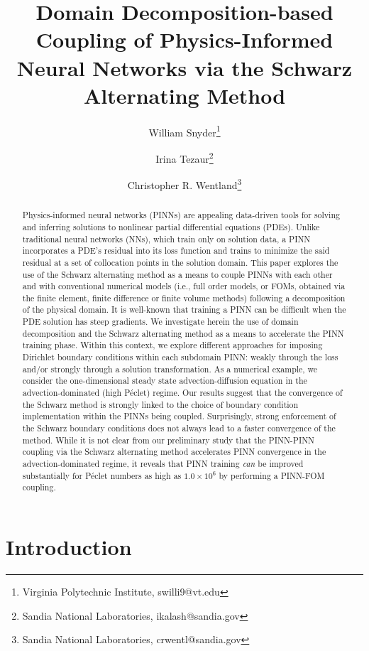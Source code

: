 \documentclass[oneside,final]{csri23}
\title{Domain Decomposition-based Coupling of Physics-Informed Neural Networks via the Schwarz Alternating Method}
\author{William Snyder\thanks{Virginia Polytechnic Institute, swilli9@vt.edu} \and Irina Tezaur\thanks{Sandia National Laboratories,
ikalash@sandia.gov} \and Christopher R. Wentland\thanks{Sandia National Laboratories, crwentl@sandia.gov}}
\begin{document}
\maketitle

\begin{abstract}
Physics-informed neural networks (PINNs) are appealing data-driven tools for solving and inferring solutions to nonlinear partial differential equations (PDEs). Unlike traditional neural networks (NNs), which train only on solution data, a PINN incorporates a PDE's residual into its loss function and trains to minimize the said residual at a set of collocation points in the solution domain. This paper explores the use of the Schwarz alternating method as a means to couple PINNs with each other and with conventional numerical models (i.e., full order models, or FOMs, obtained via the finite element, finite difference or finite volume methods) following a decomposition of the physical domain. It is well-known that training a PINN can be difficult when the PDE solution has steep gradients.
We investigate herein the use of domain decomposition and the Schwarz alternating method as a means to accelerate the PINN training phase. Within this context, we explore different approaches for imposing Dirichlet boundary conditions within each subdomain PINN: weakly through the loss and/or strongly through a solution transformation.  As a numerical example, we consider the one-dimensional steady state advection-diffusion equation in the advection-dominated (high P\'{e}clet) regime.  Our results suggest that the convergence of the Schwarz method is strongly linked to the choice of boundary condition implementation within the PINNs being coupled.  Surprisingly, strong enforcement of the Schwarz boundary conditions does not always lead to a faster convergence of the method.  While it is not clear from our preliminary study that the PINN-PINN coupling via the Schwarz alternating method accelerates PINN convergence in the advection-dominated regime, it reveals that PINN training \textit{can} be improved substantially for P\'{e}clet numbers as high as $1.0\times 10^6$ by performing a PINN-FOM coupling.
\end{abstract}


\section{Introduction} \label{WDS:sec:intro}
\end{document}
